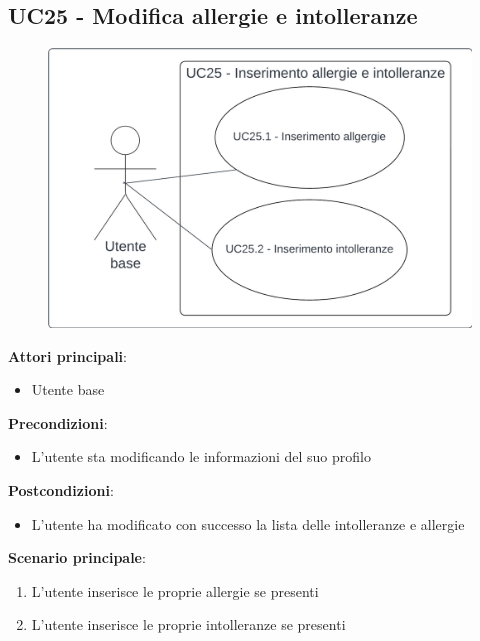 \subsection{UC25 - Modifica allergie e intolleranze}\label{usecase:25}
\begin{figure}[H]
    \centering
    \includegraphics[width=0.75\linewidth]{ucd/ucd25.png}
\end{figure}
\textbf{Attori principali}:
\begin{itemize}
    \item Utente base
\end{itemize}
\textbf{Precondizioni}:
\begin{itemize}
    \item L'utente sta modificando le informazioni del suo profilo
\end{itemize}
\textbf{Postcondizioni}:
\begin{itemize}
    \item L'utente ha modificato con successo la lista delle intolleranze e allergie
\end{itemize}
\textbf{Scenario principale}:
\begin{enumerate}
    \item L'utente inserisce le proprie allergie se presenti
    \item L'utente inserisce le proprie intolleranze se presenti
\end{enumerate}

  
